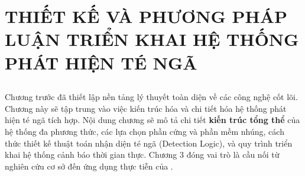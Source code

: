 \chapter[THIẾT KẾ HỆ THỐNG]{THIẾT KẾ VÀ PHƯƠNG PHÁP LUẬN TRIỂN KHAI HỆ THỐNG PHÁT HIỆN TÉ NGÃ}
\label{chap:methodology} %

\section*{} %
Chương trước đã thiết lập nền tảng lý thuyết toàn diện về các công nghệ cốt lõi. Chương này sẽ tập trung vào việc kiến trúc hóa và chi tiết hóa hệ thống phát hiện té ngã tích hợp. Nội dung chương sẽ mô tả chi tiết \textbf{kiến trúc tổng thể} của hệ thống đa phương thức, các lựa chọn phần cứng và phần mềm nhúng, cách thức thiết kế thuật toán nhận diện té ngã (Detection Logic), và quy trình triển khai hệ thống cảnh báo thời gian thực. Chương 3 đóng vai trò là cầu nối từ nghiên cứu cơ sở đến ứng dụng thực tiễn của \TENLUANVAN.




